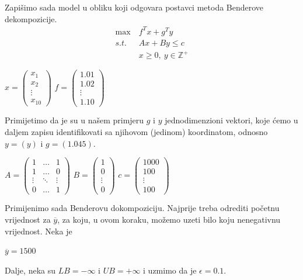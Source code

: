 \documentclass[a4paper, utf8, 11pt, colorlinks]{book}
\begin{document}
Zapišimo sada model u obliku koji odgovara postavci metoda Benderove dekompozicije.
 \begin{equation}\label{primer:formulacija2}
	\begin{aligned}
		\max\  &f^Tx+g^Ty\\
		s.t.\  &Ax+By\leqslant c\\
		&x\geqslant 0,\ y \in \mathbb{Z}^+
	\end{aligned}
\end{equation}


$x=\left(\begin{array}{c}
	x_1 \\
	x_2 \\
	\vdots \\
	x_10
\end{array}\right)$ 
$f = \left(\begin{array}{c}
	1.01 \\
	1.02 \\
	\vdots \\
	1.10
\end{array}\right)$

Primijetimo da je su u našem primjeru $g$ i $y$ jednodimenzioni vektori, koje ćemo u daljem zapisu identifikovati sa njihovom (jedinom) koordinatom, odnosno
$y=(y)$ i $g=(1.045)$. 

$A=\left(
\begin{array}{ccc}
	1 & \ldots & 1 \\
	1 & \ldots & 0 \\
	\vdots & \ddots & \vdots \\
	0 & \ldots & 1
\end{array}\right)$
$B=\left(\begin{array}{c}
	1 \\
	0 \\
	\vdots \\
	0
\end{array}\right)$ 
$c=\left(\begin{array}{c}
	1000 \\
	100 \\
	\vdots \\
	100
\end{array}\right)$ 


Primijenimo sada Benderovu dokompoziciju. Najprije treba odrediti početnu vrijednost za $\overline{y}$, za koju, u ovom koraku, možemo uzeti bilo koju nenegativnu vrijednost. Neka je 

$\overline{y}=1500$

Dalje, neka su $LB=-\infty$ i $UB=+\infty$ i uzmimo da je $\epsilon = 0.1$.
\end{document}
